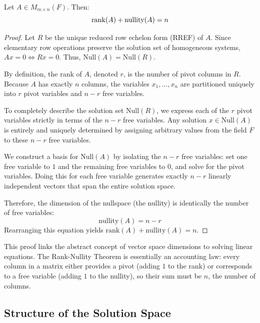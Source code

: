 \documentclass[../linear_algebra_and_groups.tex]{subfiles}
\begin{document}
\begin{theorem}
\label{thm:ranknullitymatrices}
    \begin{shaded*}
        Let $A \in M_{m\times n}(F)$. Then:
        \[ \operatorname{rank}(A) + \mathrm{nullity}(A) = n \]
    \end{shaded*}
\end{theorem}
\begin{proof}
    Let $R$ be the unique reduced row echelon form (RREF) of $A$. Since elementary row operations preserve the solution set of homogeneous systems, $Ax = 0 \iff Rx = 0$. Thus, $\text{Null}(A) = \text{Null}(R)$.

    By definition, the rank of $A$, denoted $r$, is the number of pivot columns in $R$. Because $A$ has exactly $n$ columns, the variables $x_1, \dots, x_n$ are partitioned uniquely into $r$ pivot variables and $n - r$ free variables.

    To completely describe the solution set $\text{Null}(R)$, we express each of the $r$ pivot variables strictly in terms of the $n - r$ free variables. Any solution $x \in \text{Null}(A)$ is entirely and uniquely determined by assigning arbitrary values from the field $F$ to these $n - r$ free variables. 

    We construct a basis for $\text{Null}(A)$ by isolating the $n - r$ free variables: set one free variable to $1$ and the remaining free variables to $0$, and solve for the pivot variables. Doing this for each free variable generates exactly $n - r$ linearly independent vectors that span the entire solution space. 

    Therefore, the dimension of the nullspace (the nullity) is identically the number of free variables:
    \[ \text{nullity}(A) = n - r \]
    Rearranging this equation yields $\text{rank}(A) + \text{nullity}(A) = n$.
    \qedhere
\end{proof}

\begin{remark}
    This proof links the abstract concept of vector space dimensions to solving linear equations. The Rank-Nullity Theorem is essentially an accounting law: every column in a matrix either provides a pivot (adding $1$ to the rank) or corresponds to a free variable (adding $1$ to the nullity), so their sum must be $n$, the number of columns. 
\end{remark}

\subsection{Structure of the Solution Space}
\end{document}
